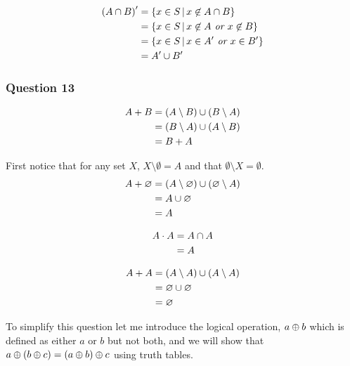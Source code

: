 \documentclass{article}
\begin{document}
\begin{align*}
	{(A\cap B)}' &= \left\{{x\in S} \,\middle|\, {x\not\in A\cap B}\right\} \\
	&= \left\{{x\in S} \,\middle|\, {x\not\in A \textit{ or } x\not\in B}\right\} \\
	&= \left\{{x\in S} \,\middle|\, {x \in {A}' \textit{ or } x\in {B}'}\right\} \\
	&= {A}' \cup {B}'
\end{align*}

\subsubsection{Question 13}
\begin{align*}
	A + B &= (A\setminus B) \cup (B\setminus A) \\
	&= (B\setminus A) \cup (A\setminus B) \\
	&= B + A
\end{align*}

First notice that for any set $X$, $X\setminus \emptyset = A$ and that $\emptyset \setminus X = \emptyset$.
\begin{align*}
	A + \varnothing &= (A \setminus \varnothing) \cup (\varnothing \setminus A)\\
	&= A \cup \varnothing \\
	&= A \\
\end{align*}

\begin{align*}
	A\cdot A &= A\cap A\\
	&= A
\end{align*}

\begin{align*}
	A + A &= (A\setminus A)\cup (A\setminus A) \\
	&= \varnothing \cup \varnothing \\
	&= \varnothing
\end{align*}

 To simplify this question let me introduce the logical operation, $a \oplus b$ which is defined as either $a$ or $b$ but not both, and we will show that $a \oplus (b\oplus c) = (a\oplus b)\oplus c$ using truth tables.
\end{document}
